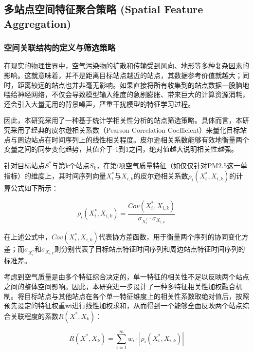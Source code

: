 \subsection{多站点空间特征聚合策略 (Spatial Feature Aggregation)}

\subsubsection{空间关联结构的定义与筛选策略}


在现实的物理世界中，空气污染物的扩散和传输受到风向、地形等多种复杂因素的影响。这就意味着，并不是距离目标站点越近的站点，其数据参考价值就越大；同时，距离较远的站点也并非毫无影响。如果直接将所有收集到的站点数据一股脑地喂给神经网络，不仅会导致模型输入维度的急剧膨胀、带来巨大的计算资源消耗，还会引入大量无用的背景噪声，严重干扰模型的特征学习过程。

因此，本研究采用了一种基于统计学相关性分析的站点筛选策略。具体而言，本研究采用了经典的皮尔逊相关系数（Pearson Correlation Coefficient）来量化目标站点与周边站点在时间序列上的线性相关程度。皮尔逊相关系数能够有效地衡量两个变量之间的同步变化趋势，其值介于-1到1之间，绝对值越大说明相关性越强。

针对目标站点$S^*$与第k个站点$S_k$，在第i项空气质量特征（如仅仅针对PM2.5这一单指标）的维度上，其时间序列向量$X_i^*$与$X_{i,k}$的皮尔逊相关系数$\rho_{i}(X_i^*, X_{i,k})$的计算公式如下所示：

\begin{equation}\label{eq:pearson}
\rho_{i}(X_i^*, X_{i,k}) = \frac{Cov(X_i^*, X_{i,k})}{\sigma_{X_i^*} \cdot \sigma_{X_{i,k}}}
\end{equation}

在上述公式中，$Cov(X_i^*, X_{i,k})$代表协方差函数，用于衡量两个序列的协同变化方差；而$\sigma_{X_i^*}$和$\sigma_{X_{i,k}}$则分别代表了目标站点特征时间序列和周边站点特征时间序列的标准差。

考虑到空气质量是由多个特征综合决定的，单一特征的相关性不足以反映两个站点之间的整体空间影响。因此，本研究进一步设计了一种多特征相关性加权融合机制。将目标站点与其他站点在各个单一特征维度上的相关性系数取绝对值后，按照预先设定的特征权重wi进行线性加权求和，从而得到一个能够全面反映两个站点综合关联程度的系数$R(X^*, X_k)$：

\begin{equation}\label{eq:weighted_corr}
R(X^*, X_k) = \sum_{i=1}^{m} w_i \cdot |\rho_{i}(X_i^*, X_{i,k})|
\end{equation} 

